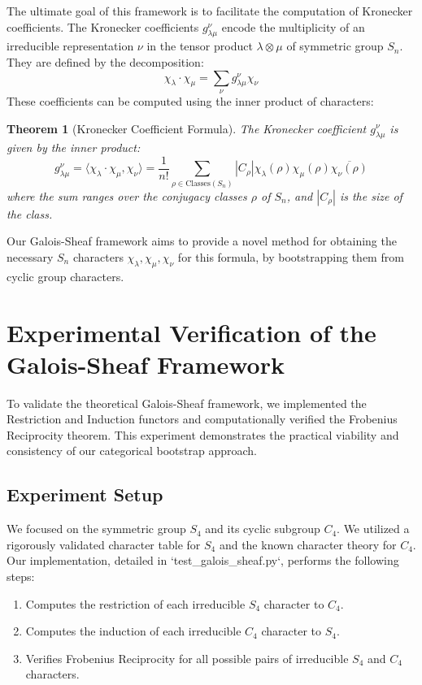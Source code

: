\documentclass[11pt]{article}
\newtheorem{theorem}{Theorem}[section]
\theoremstyle{definition}
\theoremstyle{remark}
\begin{document}
The ultimate goal of this framework is to facilitate the computation of Kronecker coefficients. The Kronecker coefficients $g^\nu_{\lambda\mu}$ encode the multiplicity of an irreducible representation $\nu$ in the tensor product $\lambda \otimes \mu$ of symmetric group $S_n$. They are defined by the decomposition:
\begin{equation}
\chi_\lambda \cdot \chi_\mu = \sum_{\nu} g^\nu_{\lambda\mu} \chi_\nu
\end{equation}
These coefficients can be computed using the inner product of characters:
\begin{theorem}[Kronecker Coefficient Formula]\label{thm:kronecker_formula}
The Kronecker coefficient $g^\nu_{\lambda\mu}$ is given by the inner product:
\begin{equation}
g^\nu_{\lambda\mu} = \langle \chi_\lambda \cdot \chi_\mu, \chi_\nu \rangle = \frac{1}{n!} \sum_{\rho \in \text{Classes}(S_n)} |C_\rho| \chi_\lambda(\rho) \chi_\mu(\rho) \overline{\chi_\nu(\rho)}
\end{equation}
where the sum ranges over the conjugacy classes $\rho$ of $S_n$, and $|C_\rho|$ is the size of the class.
\end{theorem}
Our Galois-Sheaf framework aims to provide a novel method for obtaining the necessary $S_n$ characters $\chi_\lambda, \chi_\mu, \chi_\nu$ for this formula, by bootstrapping them from cyclic group characters.

\section{Experimental Verification of the Galois-Sheaf Framework}

To validate the theoretical Galois-Sheaf framework, we implemented the Restriction and Induction functors and computationally verified the Frobenius Reciprocity theorem. This experiment demonstrates the practical viability and consistency of our categorical bootstrap approach.

\subsection{Experiment Setup}
We focused on the symmetric group $S_4$ and its cyclic subgroup $C_4$. We utilized a rigorously validated character table for $S_4$ and the known character theory for $C_4$. Our implementation, detailed in `test_galois_sheaf.py`, performs the following steps:
\begin{enumerate}
    \item Computes the restriction of each irreducible $S_4$ character to $C_4$.
    \item Computes the induction of each irreducible $C_4$ character to $S_4$.
    \item Verifies Frobenius Reciprocity for all possible pairs of irreducible $S_4$ and $C_4$ characters.
\end{enumerate}
\end{document}
